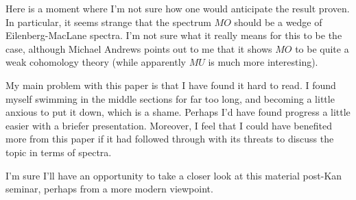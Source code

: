 \documentclass[11pt]{article}
\begin{document}
\begin{ThomGlobalPropertiesPartTwo}
Here is a moment where I'm not sure how one would anticipate the result proven. In particular, it seems strange that the spectrum $MO$ should be a wedge of Eilenberg-MacLane spectra. I'm not sure what it really means for this to be the case, although Michael Andrews points out to me that it shows $MO$ to be quite a weak cohomology theory (while apparently $MU$ is much more interesting).

My main problem with this paper is that I have found it hard to read. I found myself swimming in the middle sections for far too long, and becoming a little anxious to put it down, which is a shame. Perhaps I'd have found progress a little easier with a briefer presentation. Moreover, I feel that I could have benefited more from this paper if it had followed through with its threats to discuss the topic in terms of spectra.

I'm sure I'll have an opportunity to take a closer look at this material post-Kan seminar, perhaps from a more modern viewpoint.

\pagebreak
\end{ThomGlobalPropertiesPartTwo}
\end{document}
